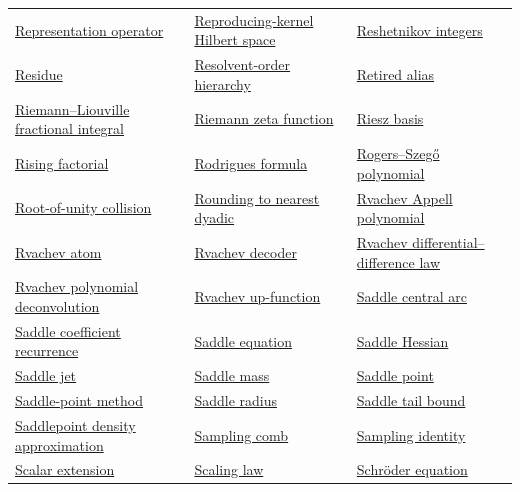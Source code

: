 \documentclass[11pt,oneside]{article}
\begin{document}
\begin{longtable}{L{0.31\textwidth}L{0.31\textwidth}L{0.31\textwidth}}
\hyperlink{gls:representation-operator}{Representation operator} & \hyperlink{gls:reproducing-kernel-hilbert-space}{Reproducing-kernel Hilbert space} & \hyperlink{gls:reshetnikov-integers}{Reshetnikov integers} \\
\hyperlink{gls:residue}{Residue} & \hyperlink{gls:resolvent-order-hierarchy}{Resolvent-order hierarchy} & \hyperlink{gls:retired-alias}{Retired alias} \\
\hyperlink{gls:riemann-liouville-fractional-integral}{Riemann--Liouville fractional integral} & \hyperlink{gls:riemann-zeta-function}{Riemann zeta function} & \hyperlink{gls:riesz-basis}{Riesz basis} \\
\hyperlink{gls:rising-factorial}{Rising factorial} & \hyperlink{gls:rodrigues-formula}{Rodrigues formula} & \hyperlink{gls:rogers-szego-polynomial}{Rogers--Szegő polynomial} \\
\hyperlink{gls:root-of-unity-collision}{Root-of-unity collision} & \hyperlink{gls:rounding-to-nearest-dyadic}{Rounding to nearest dyadic} & \hyperlink{gls:rvachev-appell-polynomial}{Rvachev Appell polynomial} \\
\hyperlink{gls:rvachev-atom}{Rvachev atom} & \hyperlink{gls:rvachev-decoder}{Rvachev decoder} & \hyperlink{gls:rvachev-differential-difference-law}{Rvachev differential--difference law} \\
\hyperlink{gls:rvachev-polynomial-deconvolution}{Rvachev polynomial deconvolution} & \hyperlink{gls:rvachev-up-function}{Rvachev up-function} & \hyperlink{gls:saddle-central-arc}{Saddle central arc} \\
\hyperlink{gls:saddle-coefficient-recurrence}{Saddle coefficient recurrence} & \hyperlink{gls:saddle-equation}{Saddle equation} & \hyperlink{gls:saddle-hessian}{Saddle Hessian} \\
\hyperlink{gls:saddle-jet}{Saddle jet} & \hyperlink{gls:saddle-mass}{Saddle mass} & \hyperlink{gls:saddle-point}{Saddle point} \\
\hyperlink{gls:saddle-point-method}{Saddle-point method} & \hyperlink{gls:saddle-radius}{Saddle radius} & \hyperlink{gls:saddle-tail-bound}{Saddle tail bound} \\
\hyperlink{gls:saddlepoint-density-approximation}{Saddlepoint density approximation} & \hyperlink{gls:sampling-comb}{Sampling comb} & \hyperlink{gls:sampling-identity}{Sampling identity} \\
\hyperlink{gls:scalar-extension}{Scalar extension} & \hyperlink{gls:scaling-law}{Scaling law} & \hyperlink{gls:schroeder-equation}{Schröder equation} \\

\end{longtable}
\end{document}
